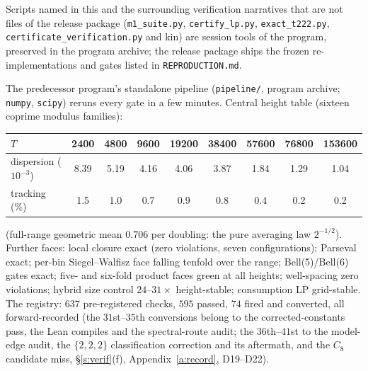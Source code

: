\documentclass[11pt]{article}
\numberwithin{equation}{section}
\theoremstyle{definition}
\theoremstyle{remark}
\begin{document}
Scripts named in this and the surrounding verification
narratives that are not files of the release package
(\texttt{m1\_suite.py}, \texttt{certify\_lp.py},
\texttt{exact\_t222.py}, \texttt{certificate\_verification.py}
and kin) are session tools of the program, preserved in the
program archive; the release package ships the frozen
re-implementations and gates listed in
\texttt{REPRODUCTION.md}.

The predecessor program's standalone pipeline
(\texttt{pipeline/}, program archive; \texttt{numpy},
\texttt{scipy}) reruns every gate in a few minutes. Central
height table (sixteen coprime modulus families):

\begin{center}
\begin{tabular}{lcccccccc}
$T$ & 2400 & 4800 & 9600 & 19200 & 38400 & 57600 & 76800 & 153600\\
\hline
dispersion ($10^{-3}$) & 8.39 & 5.19 & 4.16 & 4.06 & 3.87 & 1.84
& 1.29 & 1.04\\
tracking (\%) & 1.5 & 1.0 & 0.7 & 0.9 & 0.8 & 0.4 & 0.2 & 0.2\\
\end{tabular}
\end{center}

\noindent (full-range geometric mean $0.706$ per doubling: the
pure averaging law $2^{-1/2}$). Further faces: local closure
exact (zero violations, seven configurations); Parseval exact;
per-bin Siegel--Walfisz face falling tenfold over the range;
Bell(5)/Bell(6) gates exact; five- and six-fold product faces
green at all heights; well-spacing zero violations; hybrid size
control $24$--$31\times$ height-stable; consumption LP
grid-stable. The registry: $637$ pre-registered checks, $595$
passed, $74$ fired and converted, all forward-recorded (the
$31$st--$35$th conversions belong to the corrected-constants
pass, the Lean compiles and the spectral-route audit; the
$36$th--$41$st to the model-edge audit, the $\{2,2,2\}$
classification correction and its aftermath, and the $C_8$
candidate miss,
\S\ref{s:verif}(f), Appendix~\ref{a:record}, D19--D22).
\end{document}
